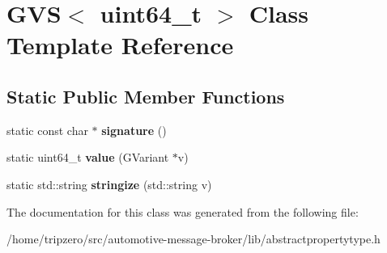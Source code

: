 \hypertarget{classGVS_3_01uint64__t_01_4}{\section{G\-V\-S$<$ uint64\-\_\-t $>$ Class Template Reference}
\label{classGVS_3_01uint64__t_01_4}
}
\subsection*{Static Public Member Functions}
\begin{DoxyCompactItemize}
\item 
\hypertarget{classGVS_3_01uint64__t_01_4_af3a581bec16849dd09e5a46a68ee5c9a}{static const char $\ast$ {\bfseries signature} ()}\label{classGVS_3_01uint64__t_01_4_af3a581bec16849dd09e5a46a68ee5c9a}

\item 
\hypertarget{classGVS_3_01uint64__t_01_4_a2d48a0a60faa407a338bf886f8120e44}{static uint64\-\_\-t {\bfseries value} (G\-Variant $\ast$v)}\label{classGVS_3_01uint64__t_01_4_a2d48a0a60faa407a338bf886f8120e44}

\item 
\hypertarget{classGVS_3_01uint64__t_01_4_a85e2ae3bd54dd831724a7cda94bcf5cb}{static std\-::string {\bfseries stringize} (std\-::string v)}\label{classGVS_3_01uint64__t_01_4_a85e2ae3bd54dd831724a7cda94bcf5cb}

\end{DoxyCompactItemize}


The documentation for this class was generated from the following file\-:\begin{DoxyCompactItemize}
\item 
/home/tripzero/src/automotive-\/message-\/broker/lib/abstractpropertytype.\-h\end{DoxyCompactItemize}
